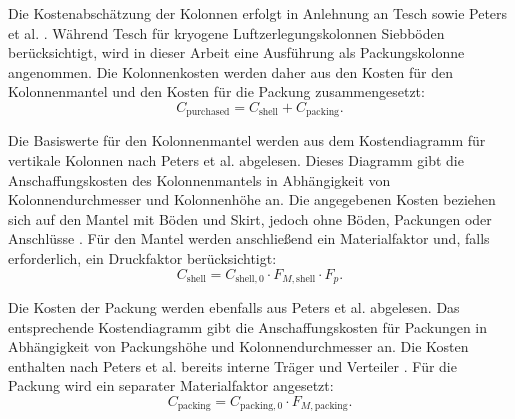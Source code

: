 Die Kostenabschätzung der Kolonnen erfolgt in Anlehnung an Tesch
\cite{teschExergybasedMethodsApplied} sowie Peters et al.
\cite{petersPlantDesignEconomics2004}. Während Tesch für kryogene Luftzerlegungskolonnen
Siebböden berücksichtigt, wird in dieser Arbeit eine Ausführung als
Packungskolonne angenommen. Die Kolonnenkosten werden daher aus den Kosten für
den Kolonnenmantel und den Kosten für die Packung zusammengesetzt:
\begin{equation}
    C_{\mathrm{purchased}}
    =
    C_{\mathrm{shell}}
    +
    C_{\mathrm{packing}} .
\end{equation}

Die Basiswerte für den Kolonnenmantel werden aus dem Kostendiagramm für
vertikale Kolonnen nach Peters et al. abgelesen. Dieses Diagramm gibt die
Anschaffungskosten des Kolonnenmantels in Abhängigkeit von Kolonnendurchmesser
und Kolonnenhöhe an. Die angegebenen Kosten beziehen sich auf den Mantel mit
Böden und Skirt, jedoch ohne Böden, Packungen oder Anschlüsse
\cite{petersPlantDesignEconomics2004}. Für den Mantel werden anschließend ein Materialfaktor
und, falls erforderlich, ein Druckfaktor berücksichtigt:
\begin{equation}
    C_{\mathrm{shell}}
    =
    C_{\mathrm{shell},0}
    \cdot F_{M,\mathrm{shell}}
    \cdot F_p .
\end{equation}

Die Kosten der Packung werden ebenfalls aus Peters et al. abgelesen. Das
entsprechende Kostendiagramm gibt die Anschaffungskosten für Packungen in
Abhängigkeit von Packungshöhe und Kolonnendurchmesser an. Die Kosten enthalten nach Peters et al. bereits interne Träger und Verteiler
\cite{petersPlantDesignEconomics2004}. Für die Packung wird ein separater Materialfaktor
angesetzt:
\begin{equation}
    C_{\mathrm{packing}}
    =
    C_{\mathrm{packing},0}
    \cdot F_{M,\mathrm{packing}} .
\end{equation}

